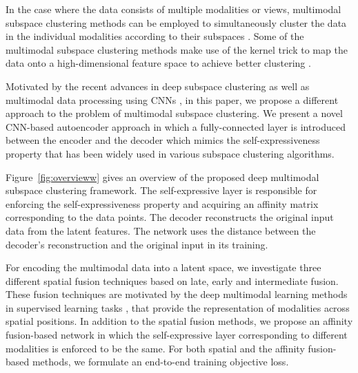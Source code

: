 \documentclass[journal]{IEEEtran}
\begin{document}
In the case where the data consists of multiple modalities or views, multimodal subspace clustering methods can be employed to simultaneously cluster the data in the individual modalities according to their subspaces \cite{MultiTask_LRR_ICCV2011,Chaudhuri,Kumar,Zhao,8052206, Convex_multiview_NIPS2012_4632, CVPR2014_multi_feature_SC, multiview_SC_AAAI_2014, desa05spectral,abavisani2018multimodal}.  Some of the multimodal subspace clustering methods make use of the kernel trick to map the data onto a high-dimensional feature space to achieve better clustering \cite{abavisani2018multimodal}.

Motivated by the recent advances in deep subspace clustering \cite{deepsc17nips} as well as multimodal data processing using CNNs \cite{ngiam2011multimodal,srivastava2012multimodal,ramachandram2017deep, kahou2016emonets,jain2014modeep,valada2016deep,antol2015vqa,donahue2015long,perera2017in2i,di2017large}, in this paper, we propose a different approach to the problem of multimodal subspace clustering.   We present a novel CNN-based autoencoder approach in which a fully-connected layer is introduced between the encoder and the decoder which mimics the self-expressiveness property that has been widely used in various subspace clustering algorithms. 

Figure~\ref{fig:overvieww} gives an overview of the proposed deep multimodal subspace clustering framework.  The self-expressive layer is responsible for enforcing the self-expressiveness property and acquiring an affinity matrix corresponding to the data points.   The decoder reconstructs the original input data from the latent features.  The network uses the distance between the decoder's reconstruction and the original input in its training.

For encoding the multimodal data into a latent space, we investigate three different spatial fusion techniques based on late, early and intermediate fusion.  These fusion techniques are motivated by the deep multimodal learning methods in supervised learning tasks \cite{kiela2018efficient, feichtenhofer2016convolutional}, that provide the representation of modalities across spatial positions.  In addition to the spatial fusion methods, we propose an affinity fusion-based network in which the self-expressive layer corresponding to different modalities is enforced to be the same.  For both spatial and the affinity fusion-based methods, we formulate an end-to-end training objective loss.  
\end{document}
